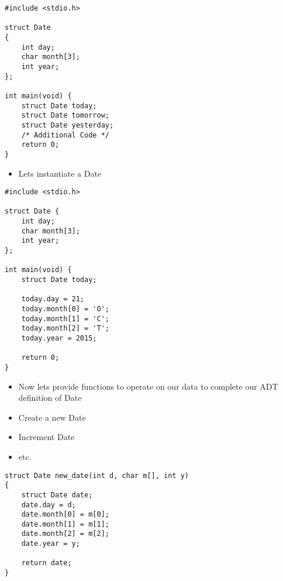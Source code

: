 \documentclass{beamer}
\begin{document}
\begin{frame}[fragile]
\begin{block}{}
\begin{lstlisting}
#include <stdio.h>

struct Date
{
    int day;
    char month[3];
    int year;
};

int main(void) {
	struct Date today;
	struct Date tomorrow;
	struct Date yesterday;
	/* Additional Code */
	return 0;
}
\end{lstlisting}
\end{block}
\end{frame}

\begin{frame}
\begin{itemize}
\item Lets instantiate a Date
\end{itemize}
\end{frame}

\begin{frame}[fragile]
\begin{block}{}
\begin{lstlisting}
#include <stdio.h>

struct Date {
    int day;
    char month[3];
    int year;
};

int main(void) {
	struct Date today;
	
	today.day = 21;
	today.month[0] = 'O';
	today.month[1] = 'C';
	today.month[2] = 'T';
	today.year = 2015;
	
	return 0;
}
\end{lstlisting}
\end{block}
\end{frame}

\begin{frame}
\begin{itemize}
\item Now lets provide functions to operate on our data to complete our ADT definition of Date
\bigskip
\item Create a new Date
\item Increment Date 
\item etc.
\end{itemize}
\end{frame}

\begin{frame}[fragile]
\begin{block}{}
\begin{lstlisting}
struct Date new_date(int d, char m[], int y)
{
    struct Date date;
    date.day = d;
    date.month[0] = m[0];
    date.month[1] = m[1];
    date.month[2] = m[2];
    date.year = y;
    
    return date;
}
\end{lstlisting}
\end{block}
\end{frame}
\end{document}
